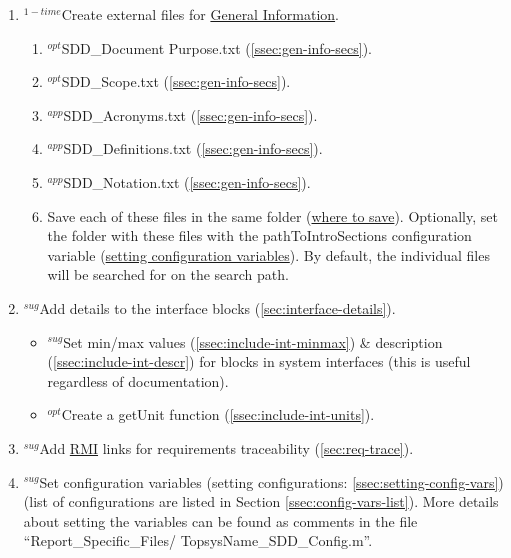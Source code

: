 \documentclass{mcscert}
\newcommand{\geninfonolink}{General Information}
\newcommand{\geninfo}{\hyperref[def:general-info]{\geninfonolink{}}}
\begin{document}
\begin{enumerate}
	\item $^{1-time}$Create external files for \geninfo{}.
	\begin{enumerate}
		\item $^{opt}$SDD\_Document Purpose.txt (\hyperref[itm:doc-purpose]{\ref*{ssec:gen-info-secs}}).
		\item $^{opt}$SDD\_Scope.txt (\hyperref[itm:scope]{\ref*{ssec:gen-info-secs}}).
		\item $^{app}$SDD\_Acronyms.txt (\hyperref[itm:acronyms]{\ref*{ssec:gen-info-secs}}).
		\item $^{app}$SDD\_Definitions.txt (\hyperref[itm:definitions]{\ref*{ssec:gen-info-secs}}).
		\item $^{app}$SDD\_Notation.txt (\hyperref[itm:notation]{\ref*{ssec:gen-info-secs}}).
		\item Save each of these files in the same folder (\hyperref[sec:where-save]{where to save}). 
		Optionally, set the folder with these files with the pathToIntroSections configuration variable (\hyperref[ssec:setting-config-vars]{setting configuration variables}). 
		By default, the individual files will be searched for on the \matlab{} search path.
	\end{enumerate}
	\item $^{sug}$Add details to the interface blocks (\hyperref[sec:interface-details]{\ref*{sec:interface-details}}).
	\begin{itemize}
		\item $^{sug}$Set min/max values (\hyperref[ssec:include-int-minmax]{\ref*{ssec:include-int-minmax}}) \& description (\hyperref[ssec:include-int-descr]{\ref*{ssec:include-int-descr}}) for blocks in system interfaces (this is useful regardless of documentation).
		\item $^{opt}$Create a getUnit function (\hyperref[ssec:include-int-units]{\ref*{ssec:include-int-units}}).
	\end{itemize}
	\item $^{sug}$Add \hyperref[acr:rmi]{RMI} links for requirements traceability (\hyperref[sec:req-trace]{\ref*{sec:req-trace}}).
	\item $^{sug}$Set configuration variables (setting configurations: \hyperref[ssec:setting-config-vars]{\ref*{ssec:setting-config-vars}}) (list of configurations are listed in Section \hyperref[ssec:config-vars-list]{\ref*{ssec:config-vars-list}}). 
	More details about setting the variables can be found as comments in the file ``Report\_Specific\_Files/ TopsysName\_SDD\_Config.m''.
	

\end{enumerate}
\end{document}
